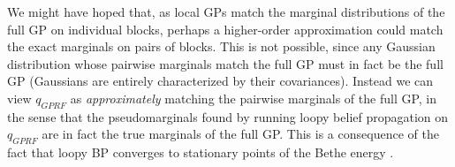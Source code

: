 \documentclass{article}
\begin{document}
We might have hoped that, as local GPs match the marginal
distributions of the full GP on individual blocks, perhaps a
higher-order approximation could match the exact marginals on pairs of
blocks. This is not possible, since any Gaussian distribution whose
pairwise marginals match the full GP must in fact be the full GP
(Gaussians are entirely characterized by their covariances). Instead we
can view $q_{GPRF}$ as {\em approximately} matching the pairwise
marginals of the full GP, in the sense that the pseudomarginals found
by running loopy belief propagation on $q_{GPRF}$ are in fact the true
marginals of the full GP. This is a consequence of the fact that loopy
BP converges to stationary points of the Bethe energy
\cite{yedidia2001bethe}.
 

{\small }
\end{document}

